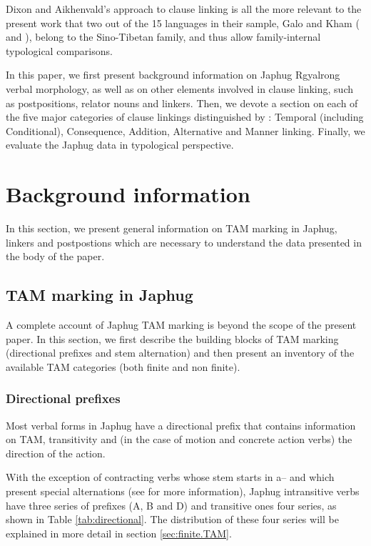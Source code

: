 \documentclass[oldfontcommands,oneside,a4paper,11pt]{article}
\newcommand{\ipa}[1]{{\phon \mbox{#1}}} %
\begin{document}
Dixon and Aikhenvald's approach to clause linking is all the more relevant to the present work that two out of the 15 languages in their sample, Galo and Kham (\citealt{post09linking} and \citealt{watters09kham}), belong to the Sino-Tibetan family, and thus allow family-internal typological comparisons.

In this paper, we first present background information on Japhug Rgyalrong verbal morphology, as well as on other elements involved in clause linking, such as postpositions, relator nouns and linkers. Then, we devote a section on each of the five major categories of clause linkings distinguished by  \citet{dixon09intro}: Temporal (including Conditional), Consequence, Addition, Alternative and Manner linking. Finally, we evaluate the Japhug data in typological perspective.


\section{Background information}
In this section, we present general information on TAM marking in Japhug, linkers and postpostions which are necessary to understand the data presented in the body of the paper.

\subsection{TAM marking in Japhug}
A complete account of Japhug TAM marking is beyond the scope of the present paper. In this section, we first  describe the building blocks of TAM marking (directional prefixes and stem alternation) and then present an inventory of the available TAM categories (both finite and non finite).

\subsubsection{Directional prefixes} \label{sec:directional}
Most verbal forms in Japhug have a directional prefix that contains information on TAM, transitivity and  (in the case of motion and concrete action verbs) the direction of the action.

With the exception of contracting verbs whose stem starts in \ipa{a--} and which present special alternations (see \citealt{jacques07passif} for more information), Japhug intransitive verbs have three series of prefixes (A, B and D) and transitive ones four series, as shown in Table \ref{tab:directional}. The distribution of these four series will be explained in more detail in section \ref{sec:finite.TAM}.
\end{document}
